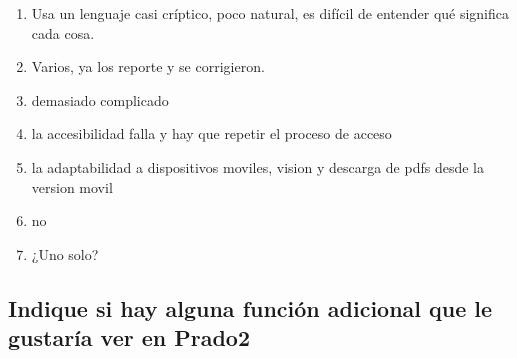 \begin{enumerate}
\item Usa un lenguaje casi críptico, poco natural, es difícil de entender qué significa cada cosa.
\item Varios, ya los reporte y se corrigieron.
\item demasiado complicado
\item la accesibilidad falla y hay que repetir el proceso de acceso
\item la adaptabilidad a dispositivos moviles, vision y descarga de pdfs desde la version movil
\item no
\item ¿Uno solo?
\end{enumerate}


\subsection{Indique si hay alguna función adicional que le gustaría ver en Prado2}
